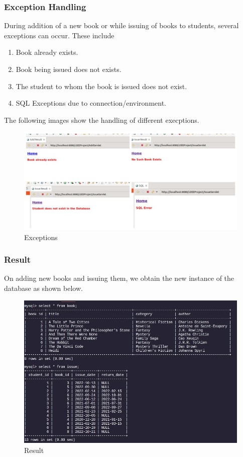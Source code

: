 \documentclass{article}
\begin{document}
\subsubsection{Exception Handling}
During addition of a new book or while issuing of books to students,
several exceptions can occur. These include
\begin{enumerate}
  \item Book already exists.
  \item Book being issued does not exists.
  \item The student to whom the book is issued does not exist.
  \item SQL Exceptions due to connection/environment.
\end{enumerate}
The following images show the handling of different execptions.
\begin{figure}[!ht]
  \begin{center}
    \includegraphics[scale=0.5]{3_e.jpg}
  \caption{Exceptions}
  \end{center}
\end{figure}

\newpage
\subsubsection{Result}
On adding new books and issuing them, we obtain the new instance of the
database as shown below.
\begin{figure}[!ht]
  \begin{center}
    \includegraphics[scale=0.8]{3_final.jpg}
  \caption{Result}
  \end{center}
\end{figure}
\end{document}
